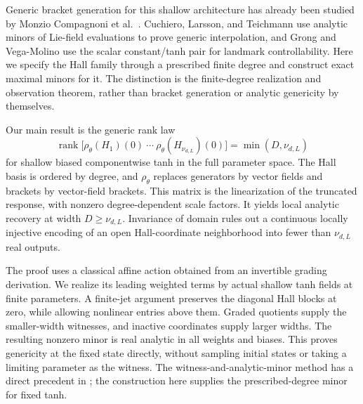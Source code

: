 \documentclass[11pt,a4paper]{article}
\numberwithin{equation}{section}
\theoremstyle{definition}
\theoremstyle{remark}
\DeclareMathOperator{\rank}{rank}
\begin{document}
Generic bracket generation for this shallow architecture has already been
studied by Monzio Compagnoni et al.\ \cite{MonzioCompagnoni}.
Cuchiero, Larsson, and Teichmann \cite{CuchieroLarssonTeichmann} use
analytic minors of Lie-field evaluations to prove generic interpolation,
and Grong and Vega-Molino \cite{GrongVegaMolino} use the scalar constant/tanh
pair for landmark controllability. Here we specify the Hall family through
a prescribed finite degree and construct exact maximal minors for it.
The distinction is the finite-degree realization and observation theorem,
rather than bracket generation or analytic genericity by themselves.

Our main result is the generic rank law
\[
 \rank\bigl[\rho_\theta(H_1)(0)\ \cdots\
                 \rho_\theta(H_{\nu_{d,L}})(0)\bigr]
 =\min(D,\nu_{d,L})
\]
for shallow biased componentwise tanh in the full parameter space.
The Hall basis is ordered by degree, and $\rho_\theta$ replaces
generators by vector fields and brackets by vector-field brackets.
This matrix is the linearization of the truncated response, with
nonzero degree-dependent scale factors. It yields local analytic
recovery at width $D\geq\nu_{d,L}$. Invariance of domain rules out a
continuous locally injective encoding of an open Hall-coordinate
neighborhood into fewer than $\nu_{d,L}$ real outputs.

The proof uses a classical affine action obtained from an invertible
grading derivation. We realize its leading weighted terms by actual
shallow tanh fields at finite parameters. A finite-jet argument preserves
the diagonal Hall blocks at zero, while allowing nonlinear entries above
them. Graded quotients supply the smaller-width witnesses, and inactive
coordinates supply larger widths. The resulting nonzero minor is real
analytic in all weights and biases. This proves genericity at the fixed
state directly, without sampling initial states or taking a limiting
parameter as the witness. The witness-and-analytic-minor method has a
direct precedent in \cite[Lemma 6.1]{CuchieroLarssonTeichmann}; the
construction here supplies the prescribed-degree minor for fixed tanh.
\end{document}
